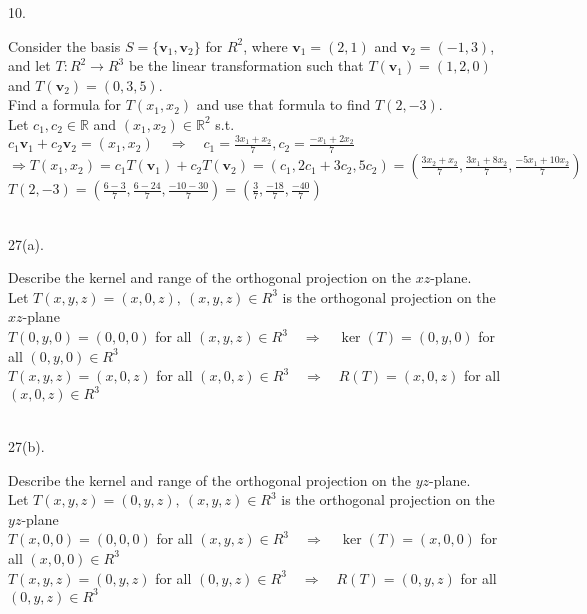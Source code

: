 \documentclass[12pt]{book}
\begin{document}
\begin{CJK}{UTF8}{bsmi}
10. \begin{minipage}[t]{\dimexpr\linewidth-2em}
Consider the basis $S=\{\textbf{v}_1, \textbf{v}_2\}$ for $R^2$, where $\textbf{v}_1=(2, 1)$ and $\textbf{v}_2=(-1, 3)$, and let $T:R^2\rightarrow R^3$ be the linear transformation such that $T(\textbf{v}_1)=(1, 2, 0)$ and $T(\textbf{v}_2)=(0, 3, 5)$. \\
Find a formula for $T(x_1, x_2)$ and use that formula to find $T(2, -3)$. \\
Let $c_1, c_2\in\mathbb{R}$ and $(x_1, x_2)\in\mathbb{R}^2$ s.t. $\displaystyle c_1\textbf{v}_1+c_2\textbf{v}_2=(x_1, x_2)\quad\Rightarrow\quad c_1=\frac{3x_1+x_2}{7}, c_2=\frac{-x_1+2x_2}{7}$ \\
$\displaystyle\Rightarrow T(x_1, x_2)=c_1T(\textbf{v}_1)+c_2T(\textbf{v}_2)=(c_1, 2c_1+3c_2, 5c_2)=\left(\frac{3x_2+x_2}{7}, \frac{3x_1+8x_2}{7}, \frac{-5x_1+10x_2}{7}\right)$ \\
$\displaystyle T(2, -3)=\left(\frac{6-3}{7}, \frac{6-24}{7}, \frac{-10-30}{7}\right)=\left(\frac{3}{7}, \frac{-18}{7}, \frac{-40}{7}\right)$
\end{minipage}\\

27(a). \begin{minipage}[t]{\dimexpr\linewidth-2em}
Describe the kernel and range of the orthogonal projection on the $xz$-plane. \\
Let $T(x, y, z)=(x, 0, z),\ (x, y, z)\in R^3$ is the orthogonal projection on the $xz$-plane \\
$T(0, y, 0)=(0, 0, 0)$ for all $(x, y, z)\in R^3\quad\Rightarrow\quad\ker(T)=(0, y, 0)$ for all $(0, y, 0)\in R^3$ \\
$T(x, y, z)=(x, 0, z)$ for all $(x, 0, z)\in R^3\quad\Rightarrow\quad R(T)=(x, 0, z)$ for all $(x, 0, z)\in R^3$
\end{minipage}\\

27(b). \begin{minipage}[t]{\dimexpr\linewidth-2em}
Describe the kernel and range of the orthogonal projection on the $yz$-plane. \\
Let $T(x, y, z)=(0, y, z),\ (x, y, z)\in R^3$ is the orthogonal projection on the $yz$-plane \\
$T(x, 0, 0)=(0, 0, 0)$ for all $(x, y, z)\in R^3\quad\Rightarrow\quad\ker(T)=(x, 0, 0)$ for all $(x, 0, 0)\in R^3$ \\
$T(x, y, z)=(0, y, z)$ for all $(0, y, z)\in R^3\quad\Rightarrow\quad R(T)=(0, y, z)$ for all $(0, y, z)\in R^3$
\end{minipage}\\


\end{CJK}
\end{document}
